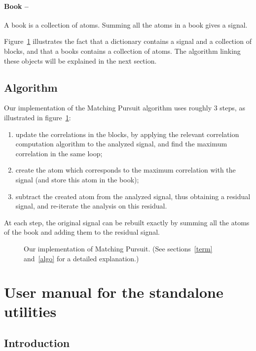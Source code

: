 \documentclass[11pt,a4paper]{article}
\begin{document}
\paragraph{Book --} A book is a collection of atoms. Summing all the atoms in
a book gives a signal.

\bigskip

\noindent Figure~\ref{mpcycle} illustrates the fact that a dictionary contains
a signal and a collection of blocks, and that a books contains a collection of
atoms.  The algorithm linking these objects will be explained in the next
section.


\subsection{Algorithm \label{algo}}
Our implementation of the Matching Pursuit algorithm uses roughly 3 steps, as
illustrated in figure~\ref{mpcycle}:
\begin{enumerate}
\item update the correlations in the blocks, by applying the relevant
  correlation computation algorithm to the analyzed signal, and find the
  maximum correlation in the same loop;
\item create the atom which corresponds to the maximum correlation with the
  signal (and store this atom in the book);
\item subtract the created atom from the analyzed signal, thus obtaining a
  residual signal, and re-iterate the analysis on this residual.
\end{enumerate}
At each step, the original signal can be rebuilt exactly by summing all the
atoms of the book and adding them to the residual signal.

\begin{figure}[hbp]
\vspace{2em}
\centerline{}
\caption{\label{mpcycle}Our implementation of Matching Pursuit. (See
  sections~\ref{term} and~\ref{algo} for a detailed explanation.)}
\end{figure}


\clearpage
\section{User manual for the standalone utilities \label{man}}

\subsection{Introduction}
\end{document}
